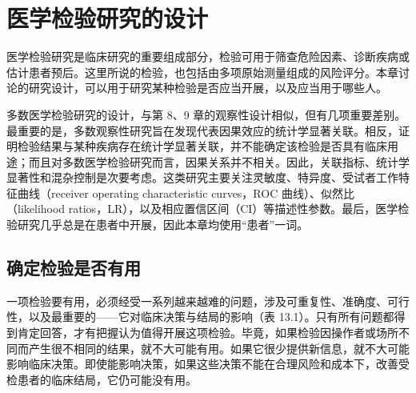 \chapter{医学检验研究的设计}
\label{ch:13}

医学检验研究是临床研究的重要组成部分，检验可用于筛查危险因素、诊断疾病或估计患者预后。这里所说的检验，也包括由多项原始测量组成的风险评分。本章讨论的研究设计，可以用于研究某种检验是否应当开展，以及应当用于哪些人。

多数医学检验研究的设计，与第 8、9 章的观察性设计相似，但有几项重要差别。最重要的是，多数观察性研究旨在发现代表因果效应的统计学显著关联。相反，证明检验结果与某种疾病存在统计学显著关联，并不能确定该检验是否具有临床用途；而且对多数医学检验研究而言，因果关系并不相关。因此，关联指标、统计学显著性和混杂控制是次要考虑。这类研究主要关注灵敏度、特异度、受试者工作特征曲线（receiver operating characteristic curves，ROC 曲线）、似然比（likelihood ratios，LR），以及相应置信区间（CI）等描述性参数。最后，医学检验研究几乎总是在患者中开展，因此本章均使用“患者”一词。

\section{确定检验是否有用}
一项检验要有用，必须经受一系列越来越难的问题，涉及可重复性、准确度、可行性，以及最重要的——它对临床决策与结局的影响（表 13.1）。只有所有问题都得到肯定回答，才有把握认为值得开展这项检验。毕竟，如果检验因操作者或场所不同而产生很不相同的结果，就不大可能有用。如果它很少提供新信息，就不大可能影响临床决策。即使能影响决策，如果这些决策不能在合理风险和成本下，改善受检患者的临床结局，它仍可能没有用。

